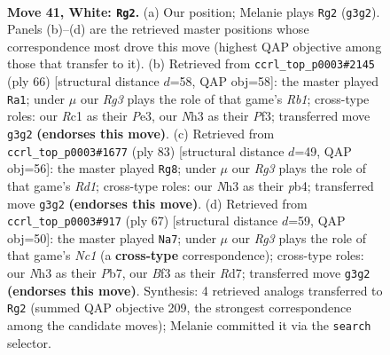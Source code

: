 \documentclass[11pt]{article}
\begin{document}
\clearpage

\begin{figure}[p]\centering
\begin{subfigure}{0.46\textwidth}\centering
\resizebox{\linewidth}{!}{%
\newchessgame
\chessboard[
  setfen={3r2k1/3b1p1p/1p4r1/p7/P2p2P1/1P1K1BRN/7P/2R5 w - - 2 41},
  showmover=false,
  pgfstyle=straightmove, color=movearrow, markmove={g3-g2}
]}
\caption{}
\end{subfigure}\hfill
\begin{subfigure}{0.46\textwidth}\centering
\resizebox{\linewidth}{!}{%
\newchessgame
\chessboard[
  setfen={8/pr2kbp1/1r3p1p/3p3P/1P1R4/3BPPK1/6P1/1R6 w - - 2 34},
  showmover=false,
  pgfstyle=straightmove, color=movearrow, markmove={b1-a1}
]}
\caption{}
\end{subfigure}
\\[4pt]
\begin{subfigure}{0.46\textwidth}\centering
\resizebox{\linewidth}{!}{%
\newchessgame
\chessboard[
  setfen={3r3k/5r2/p1b2p1p/3p4/1P1R1P1P/2p1P3/P4PB1/3R2K1 b - - 1 42},
  showmover=false,
  pgfstyle=straightmove, color=movearrow, markmove={d8-g8}
]}
\caption{}
\end{subfigure}\hfill
\begin{subfigure}{0.46\textwidth}\centering
\resizebox{\linewidth}{!}{%
\newchessgame
\chessboard[
  setfen={2n4k/1ppr2p1/5p1p/1PR5/r4P2/4P3/5PKP/B1R5 b - - 0 34},
  showmover=false,
  pgfstyle=straightmove, color=movearrow, markmove={c8-a7}
]}
\caption{}
\end{subfigure}
\caption{\textbf{Move 41, White: \texttt{Rg2}.} (a) Our position; Melanie plays \texttt{Rg2} (\texttt{g3g2}). Panels (b)--(d) are the retrieved master positions whose correspondence most drove this move (highest QAP objective among those that transfer to it). (b) Retrieved from \texttt{ccrl\_top\_p0003\#2145} (ply 66) [structural distance $d$=58, QAP obj=58]: the master played \texttt{Ra1}; under $\mu$ our \emph{Rg3} plays the role of that game's \emph{Rb1}; cross-type roles: our \emph{R}c1 as their \emph{P}e3, our \emph{N}h3 as their \emph{P}f3; transferred move \texttt{g3g2} \textbf{(endorses this move)}. (c) Retrieved from \texttt{ccrl\_top\_p0003\#1677} (ply 83) [structural distance $d$=49, QAP obj=56]: the master played \texttt{Rg8}; under $\mu$ our \emph{Rg3} plays the role of that game's \emph{Rd1}; cross-type roles: our \emph{N}h3 as their \emph{p}b4; transferred move \texttt{g3g2} \textbf{(endorses this move)}. (d) Retrieved from \texttt{ccrl\_top\_p0003\#917} (ply 67) [structural distance $d$=59, QAP obj=50]: the master played \texttt{Na7}; under $\mu$ our \emph{Rg3} plays the role of that game's \emph{Nc1} (a \textbf{cross-type} correspondence); cross-type roles: our \emph{N}h3 as their \emph{P}b7, our \emph{B}f3 as their \emph{R}d7; transferred move \texttt{g3g2} \textbf{(endorses this move)}. Synthesis: 4 retrieved analogs transferred to \texttt{Rg2} (summed QAP objective 209, the strongest correspondence among the candidate moves); Melanie committed it via the \texttt{search} selector.}
\label{fig:thought-m80}
\end{figure}
\end{document}
